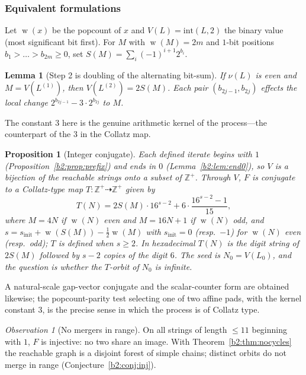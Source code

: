 \documentclass[a4paper]{article}
\theoremstyle{plain}
\newtheorem{proposition}{Proposition}[subsection]
\newtheorem{lemma}{Lemma}[subsection]
\theoremstyle{definition}
\theoremstyle{remark}
\newtheorem{observation}{Observation}[subsection]
\DeclareMathOperator{\popcount}{w}
\begin{document}
\subsubsection{Equivalent formulations}\label{b2:sec:equiv}
Let $\popcount(x)$ be the popcount of $x$ and $V(L)=\mathrm{int}(L,2)$ the binary value (most significant bit first). For $M$ with $\popcount(M)=2m$ and $1$-bit positions $b_1>\dots>b_{2m}\ge 0$, set $S(M)=\sum_i(-1)^{i+1}2^{b_i}$.

\begin{lemma}[Step 2 is doubling of the alternating bit-sum]\label{b2:lem:S}
If $\nu(L)$ is even and $M=V(L^{(1)})$, then $V(L^{(2)})=2S(M)$. Each pair $(b_{2j-1},b_{2j})$ effects the local change $2^{b_{2j-1}}-3\cdot 2^{b_{2j}}$ to $M$.
\end{lemma}

The constant $3$ here is the genuine arithmetic kernel of the process---the counterpart of the $3$ in the Collatz map.

\begin{proposition}[Integer conjugate]\label{b2:prop:T}
Each defined iterate begins with $1$ (Proposition~\ref{b2:prop:prefix}) and ends in $0$ (Lemma~\ref{b2:lem:end0}), so $V$ is a bijection of the reachable strings onto a subset of $\mathbb Z^+$. Through $V$, $F$ is conjugate to a Collatz-type map $T:\mathbb Z^+\dashrightarrow\mathbb Z^+$ given by
\[ T(N)=2S(M)\cdot 16^{s-2}+6\cdot\frac{16^{s-2}-1}{15}, \]
where $M=4N$ if $\popcount(N)$ even and $M=16N+1$ if $\popcount(N)$ odd, and $s=s_{\mathrm{init}}+\popcount(S(M))-\tfrac12\popcount(M)$ with $s_{\mathrm{init}}=0$ (resp.\ $-1$) for $\popcount(N)$ even (resp.\ odd); $T$ is defined when $s\ge 2$. In hexadecimal $T(N)$ is the digit string of $2S(M)$ followed by $s-2$ copies of the digit $6$. The seed is $N_0=V(L_0)$, and the question is whether the $T$-orbit of $N_0$ is infinite.
\end{proposition}

A natural-scale gap-vector conjugate and the scalar-counter form are obtained likewise; the popcount-parity test selecting one of two affine pads, with the kernel constant $3$, is the precise sense in which the process is of Collatz type.

\begin{observation}[No mergers in range]\label{b2:obs:inj}
On all strings of length $\le 11$ beginning with $1$, $F$ is injective: no two share an image. With Theorem~\ref{b2:thm:nocycles} the reachable graph is a disjoint forest of simple chains; distinct orbits do not merge in range (Conjecture~\ref{b2:conj:inj}).
\end{observation}
\end{document}
